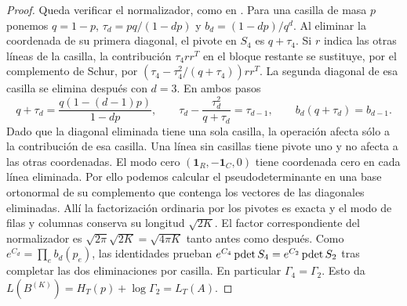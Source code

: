 \begin{proof}
Queda verificar el normalizador, como en \cite[Sección~8.1]{pred}. Para una casilla de masa $p$
ponemos $q=1-p$, $\tau_d=pq/(1-dp)$ y $b_d=(1-dp)/q^d$. Al eliminar la coordenada de su primera
diagonal, el pivote en $S_4$ es $q+\tau_4$. Si $r$ indica las otras líneas de la casilla, la
contribución $\tau_4rr^T$ en el bloque restante se sustituye, por el complemento de Schur, por
$(\tau_4-\tau_4^2/(q+\tau_4))rr^T$. La segunda diagonal de esa casilla se elimina después con $d=3$.
En ambos pasos
\[
 q+\tau_d=\frac{q(1-(d-1)p)}{1-dp},\qquad
 \tau_d-\frac{\tau_d^2}{q+\tau_d}=\tau_{d-1},\qquad
 b_d(q+\tau_d)=b_{d-1}.
\]
Dado que la diagonal eliminada tiene una sola casilla, la operación afecta sólo a la contribución de
esa casilla. Una línea sin casillas tiene pivote uno y no afecta a las otras coordenadas. El modo cero
$(\mathbf1_R,-\mathbf1_C,0)$ tiene coordenada cero en cada línea eliminada. Por ello podemos calcular
el pseudodeterminante en una base ortonormal de su complemento que contenga los vectores de las
diagonales eliminadas. Allí la factorización ordinaria por los pivotes es exacta y el modo de filas y
columnas conserva su longitud $\sqrt{2K}$. El factor correspondiente del normalizador es
$\sqrt{2\pi}\sqrt{2K}=\sqrt{4\pi K}$ tanto antes como después. Como $e^{C_d}=\prod_e b_d(p_e)$, las
identidades prueban
$e^{C_4}\operatorname{pdet} S_4=e^{C_2}\operatorname{pdet} S_2$ tras completar las dos eliminaciones por casilla. En particular
$\Gamma_4=\Gamma_2$. Esto da $L(B^{(K)})=H_T(p)+\log\Gamma_2=L_T(A)$.
\end{proof}
